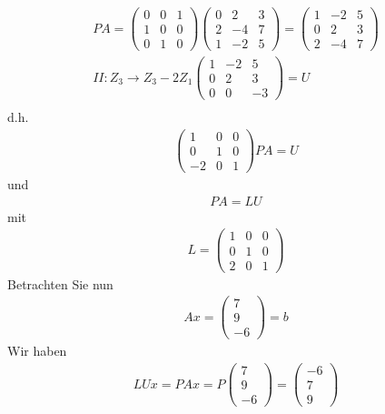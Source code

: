 \documentclass[11pt]{report}
\begin{document}
\begin{align}
PA = \begin{pmatrix} 0 & 0 & 1 \\ 1 & 0 & 0 \\ 0 & 1 & 0 \end{pmatrix} \begin{pmatrix} 0 & 2 & 3 \\ 2 & -4 & 7 \\ 1 & -2 & 5 \end{pmatrix} = \begin{pmatrix} 1 & -2 & 5 \\ 0 & 2 & 3 \\ 2 & -4 & 7 \end{pmatrix}\\
II: Z_3 \rightarrow Z_3 - 2 Z_1 \begin{pmatrix} 1 & -2 & 5 \\ 0 & 2 & 3 \\ 0 & 0 & -3 \end{pmatrix} = U \\
\end{align}
d.h.
\begin{align}
\begin{pmatrix} 1 & 0 & 0\\ 0 & 1 & 0 \\ -2 & 0 & 1 \end{pmatrix} PA = U
\end{align}
und
\begin{align}
PA = LU
\end{align}
mit
\begin{align}
L = \begin{pmatrix} 1 & 0 & 0 \\ 0 & 1 & 0 \\ 2 & 0 & 1 \end{pmatrix}
\end{align}
Betrachten Sie nun
\begin{align}
Ax = \begin{pmatrix} 7 \\ 9 \\ -6 \end{pmatrix} = b
\end{align}
Wir haben
\begin{align}
LUx = PAx = P \begin{pmatrix} 7 \\ 9 \\ -6 \end{pmatrix} = \begin{pmatrix} -6 \\ 7 \\ 9 \end{pmatrix}
\end{align}
\end{document}
